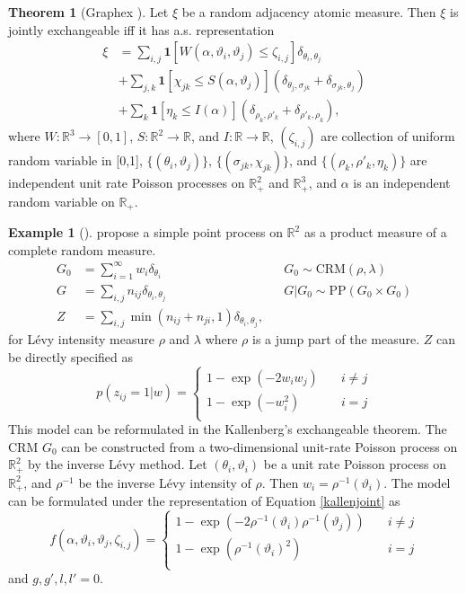 \documentclass{article}
\theoremstyle{definition}
\newtheorem{example}{Example}[definition]
\newtheorem{theorem}[definition]{Theorem}
\begin{document}
\begin{theorem}[Graphex \citep{Veitch2015}] Let $\xi$ be a random adjacency atomic measure. Then $\xi$ is jointly exchangeable iff it has a.s. representation
\begin{align}
\xi &= \sum_{i,j}\mathbf{1} [W(\alpha, \vartheta_i, \vartheta_j) \leq \zeta_{i,j}]\delta_{\theta_i, \theta_j} \\
&+\sum_{j,k} \mathbf{1} [\chi_{jk} \leq S(\alpha, \vartheta_j)](\delta_{\theta_j,\sigma_{jk}} +  \delta_{\sigma_{jk},\theta_j}) \\
&+\sum_{k} \mathbf{1} [\eta_{k} \leq I(\alpha)](\delta_{\rho_k,\rho'_k} + \delta_{\rho'_k, \rho_k}),
\end{align}
where $W:\mathbb{R}^3 \rightarrow [0,1]$, $S:\mathbb{R}^2 \rightarrow \mathbb{R}$, and $I:\mathbb{R}\rightarrow\mathbb{R}$, $(\zeta_{i,j})$ are collection of uniform random variable in [0,1], $\{(\theta_i, \vartheta_j)\}$, $\{(\sigma_{jk}, \chi_{jk})\}$, and $\{(\rho_k, \rho'_k, \eta_{k})\}$ are independent unit rate Poisson processes on $\mathbb{R}^2_+$ and $\mathbb{R}^3_+$, and $\alpha$ is an independent random variable on $\mathbb{R}_+$.
\end{theorem}

\begin{example}[\cite{Caron2015}]
\cite{Caron2015} propose a simple point process on $\mathbb{R}^2$ as a product measure of a complete random measure.
\begin{align}
G_0 &= \sum_{i=1}^{\infty} w_i \delta_{\theta_i} & &G_0 \sim \text{CRM}(\rho, \lambda)\\
G &= \sum_{i,j} n_{ij} \delta_{\theta_i, \theta_j} & &G|G_0 \sim \text{PP}(G_0 \times G_0)\\
Z &=\sum_{i,j} \min(n_{ij} + n_{ji}, 1)\delta_{\theta_i, \theta_j}, &&
\end{align}
for L\'{e}vy intensity measure $\rho$ and $\lambda$ where $\rho$ is a jump part of the measure.
$Z$ can be directly specified as
\[ p(z_{ij}=1|w) = 
  \begin{cases}
    1 - \exp(-2w_iw_j)       & \quad i \neq j\\
    1 - \exp(-w_i^2) & \quad i = j\\
  \end{cases}
\]
This model can be reformulated in the Kallenberg's exchangeable theorem. The CRM $G_0$ can be constructed from a two-dimensional unit-rate Poisson process on $\mathbb{R}_+^2$ by the inverse L\'{e}vy method. Let $(\theta_i, \vartheta_i)$ be a unit rate Poisson process on $\mathbb{R}_+^2$, and $\rho^{-1}$ be the inverse L\'{e}vy intensity of $\rho$. Then $w_i = \rho^{-1}(\vartheta_i)$. The model can be formulated under the representation of Equation \ref{kallenjoint} as 
\[ f(\alpha, \vartheta_i, \vartheta_j, \zeta_{i,j}) =
	\begin{cases}
	1- \exp(-2\rho^{-1}(\vartheta_i)\rho^{-1}(\vartheta_j)) & \quad i \neq j\\
    1 - \exp( \rho^{-1}(\vartheta_i)^2) & \quad i = j\\
	\end{cases}
\]
and $g,g',l,l'=0$. 
\end{example}
\end{document}
